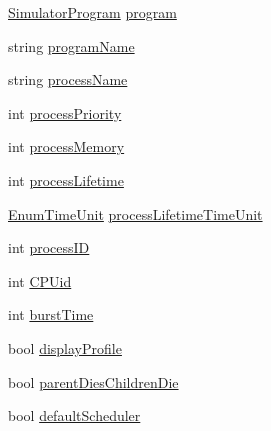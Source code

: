 \begin{DoxyCompactItemize}
\item 
\hyperlink{class_c_p_u___o_s___simulator_1_1_c_p_u_1_1_simulator_program}{Simulator\+Program} \hyperlink{struct_c_p_u___o_s___simulator_1_1_operating___system_1_1_process_flags_addf9316ebaddcec9f466b0317d15d45c}{program}
\item 
string \hyperlink{struct_c_p_u___o_s___simulator_1_1_operating___system_1_1_process_flags_af219a7a8b99d0c94b5847797dabb39f6}{program\+Name}
\item 
string \hyperlink{struct_c_p_u___o_s___simulator_1_1_operating___system_1_1_process_flags_a2823e57851d2940c47cd06afd0487360}{process\+Name}
\item 
int \hyperlink{struct_c_p_u___o_s___simulator_1_1_operating___system_1_1_process_flags_a0a14c1f617bd3cd4d2b28b5f13cf83d5}{process\+Priority}
\item 
int \hyperlink{struct_c_p_u___o_s___simulator_1_1_operating___system_1_1_process_flags_a2ed1133d00c4d6d39f9e5cd70febbacb}{process\+Memory}
\item 
int \hyperlink{struct_c_p_u___o_s___simulator_1_1_operating___system_1_1_process_flags_a45de0517d0705f5c9ff1322e969cae20}{process\+Lifetime}
\item 
\hyperlink{namespace_c_p_u___o_s___simulator_1_1_operating___system_a0553d0bc2513aec52caa769acf994d5c}{Enum\+Time\+Unit} \hyperlink{struct_c_p_u___o_s___simulator_1_1_operating___system_1_1_process_flags_af7b24dbd3fd07741d54984f6261694f6}{process\+Lifetime\+Time\+Unit}
\item 
int \hyperlink{struct_c_p_u___o_s___simulator_1_1_operating___system_1_1_process_flags_a5a0ef784d6cef8d5d42ab43b69972f5b}{process\+I\+D}
\item 
int \hyperlink{struct_c_p_u___o_s___simulator_1_1_operating___system_1_1_process_flags_a204157ba5a9571934344bef2378f88bf}{C\+P\+Uid}
\item 
int \hyperlink{struct_c_p_u___o_s___simulator_1_1_operating___system_1_1_process_flags_ac0e98ee86de3c22c7a022e3dcd69935f}{burst\+Time}
\item 
bool \hyperlink{struct_c_p_u___o_s___simulator_1_1_operating___system_1_1_process_flags_a8290519886f3517f690f3acba8330440}{display\+Profile}
\item 
bool \hyperlink{struct_c_p_u___o_s___simulator_1_1_operating___system_1_1_process_flags_a8ef3875fcd47a5f1fa37b61a2979b813}{parent\+Dies\+Children\+Die}
\item 
bool \hyperlink{struct_c_p_u___o_s___simulator_1_1_operating___system_1_1_process_flags_a927e8e998250ab57385146cf8dd487b8}{default\+Scheduler}

\end{DoxyCompactItemize}
